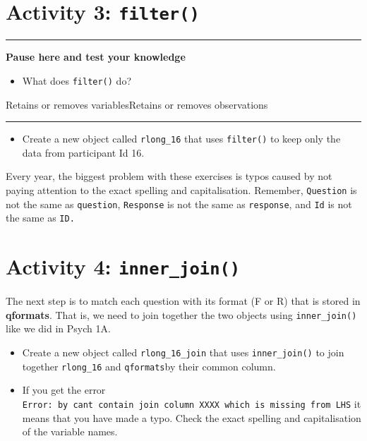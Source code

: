 \documentclass[
  oneside]{book}
\providecommand{\tightlist}{%
  \setlength{\itemsep}{0pt}\setlength{\parskip}{0pt}}
\begin{document}
\hypertarget{activity-3-filter}{%
\section{\texorpdfstring{Activity 3: \texttt{filter()}}{Activity 3: filter()}}\label{activity-3-filter}}

\begin{center}\rule{0.5\linewidth}{0.5pt}\end{center}

\textbf{Pause here and test your knowledge}

\begin{itemize}
\tightlist
\item
  What does \texttt{filter()} do?
\end{itemize}

Retains or removes variablesRetains or removes observations

\begin{center}\rule{0.5\linewidth}{0.5pt}\end{center}

\begin{itemize}
\tightlist
\item
  Create a new object called \texttt{rlong\_16} that uses \texttt{filter()} to keep only the data from participant Id 16.
\end{itemize}

\begin{danger}
Every year, the biggest problem with these exercises is typos caused by
not paying attention to the exact spelling and capitalisation. Remember,
\texttt{Question} is not the same as \texttt{question},
\texttt{Response} is not the same as \texttt{response}, and \texttt{Id}
is not the same as \texttt{ID.}
\end{danger}

\hypertarget{activity-4-inner_join}{%
\section{\texorpdfstring{Activity 4: \texttt{inner\_join()}}{Activity 4: inner\_join()}}\label{activity-4-inner_join}}

The next step is to match each question with its format (F or R) that is stored in \textbf{qformats}. That is, we need to join together the two objects using \texttt{inner\_join()} like we did in Psych 1A.

\begin{itemize}
\tightlist
\item
  Create a new object called \texttt{rlong\_16\_join} that uses \texttt{inner\_join()} to join together \texttt{rlong\_16} and \texttt{qformats}by their common column.
\item
  If you get the error \texttt{Error:\ by\ can\textquotesingle{}t\ contain\ join\ column\ XXXX\ which\ is\ missing\ from\ LHS} it means that you have made a typo. Check the exact spelling and capitalisation of the variable names.
\end{itemize}
\end{document}

